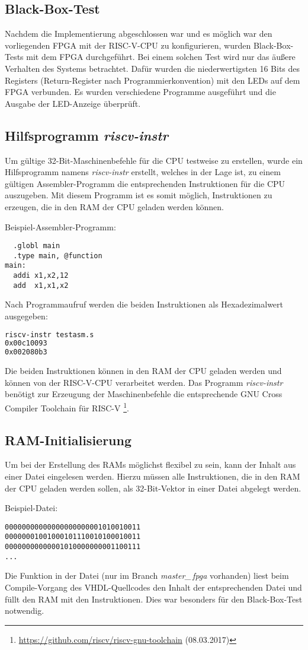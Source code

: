 \subsection{Black-Box-Test}
Nachdem die Implementierung abgeschlossen war und es möglich war den
vorliegenden FPGA mit der RISC-V-CPU zu konfigurieren, wurden
Black-Box-Tests mit dem FPGA durchgeführt. Bei einem solchen Test wird
nur das äußere Verhalten des Systems betrachtet. \cite[S. 311]{Kleuker} Dafür wurden die niederwertigsten 16 Bits
des Registers  (Return-Register nach Programmierkonvention) mit den LEDs auf dem FPGA verbunden. Es
wurden verschiedene Programme ausgeführt und die Ausgabe der LED-Anzeige
überprüft.

\subsection{Hilfsprogramm \emph{riscv-instr}}
Um gültige 32-Bit-Maschinenbefehle für die CPU testweise zu erstellen,
wurde ein Hilfsprogramm namens \emph{riscv-instr} erstellt, welches in
der Lage ist, zu einem gültigen Assembler-Programm die entsprechenden
Instruktionen für die CPU auszugeben. Mit diesem Programm ist es somit
möglich, Instruktionen zu erzeugen, die in den RAM der CPU geladen werden
können.

Beispiel-Assembler-Programm:
\begin{lstlisting}
  .globl main
  .type main, @function
main:
  addi x1,x2,12 
  add  x1,x1,x2
\end{lstlisting}

Nach Programmaufruf werden die beiden Instruktionen als Hexadezimalwert
ausgegeben:
\begin{lstlisting}[language=bash]
riscv-instr testasm.s
0x00c10093 
0x002080b3 
\end{lstlisting}
Die beiden Instruktionen können in den RAM der CPU geladen werden und
können von der RISC-V-CPU verarbeitet werden. Das Programm
\emph{riscv-instr} benötigt zur Erzeugung der Maschinenbefehle die 
entsprechende GNU Cross Compiler Toolchain für RISC-V
\footnote{\url{https://github.com/riscv/riscv-gnu-toolchain}
(08.03.2017)}. 

\subsection{RAM-Initialisierung}
\label{ram-init}
Um bei der Erstellung des RAMs möglichst flexibel zu sein, kann der
Inhalt aus einer Datei eingelesen werden. \cite[S. 187]{XST}
Hierzu müssen alle Instruktionen, die in den RAM der CPU geladen werden
sollen, als 32-Bit-Vektor in einer Datei abgelegt werden.

Beispiel-Datei:
\begin{lstlisting}
00000000000000000000001010010011
00000001001000101110010100010011
00000000000001010000000001100111
...
\end{lstlisting}

Die Funktion  in der Datei 
(nur im Branch \emph{master\_\,fpga} vorhanden) liest beim Compile-Vorgang
des VHDL-Quellcodes den Inhalt der entsprechenden Datei und füllt den RAM mit den
Instruktionen. Dies war besonders für den Black-Box-Test notwendig.
